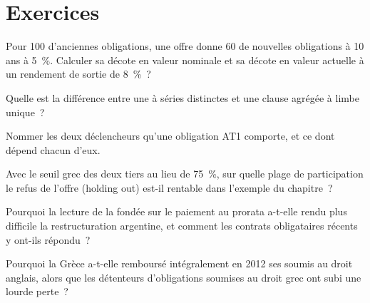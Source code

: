 \section{Exercices}

\begin{exercise}[$\star$]\label{exo:m2:distressed-sovereign-and-bank-capital-credit:1}
Pour 100 d'anciennes obligations, une offre donne 60 de nouvelles obligations à 10 ans à 5~\%. Calculer sa
décote en valeur nominale et sa décote en valeur actuelle à un rendement de sortie de 8~\%~?
\end{exercise}

\begin{exercise}[$\star$]\label{exo:m2:distressed-sovereign-and-bank-capital-credit:2}
Quelle est la différence entre une  à séries distinctes et une
clause agrégée à limbe unique~?
\end{exercise}

\begin{exercise}[$\star$]\label{exo:m2:distressed-sovereign-and-bank-capital-credit:3}
Nommer les deux déclencheurs qu'une obligation AT1 comporte, et ce dont dépend chacun d'eux.
\end{exercise}

\begin{exercise}[$\star\star$]\label{exo:m2:distressed-sovereign-and-bank-capital-credit:4}
Avec le seuil grec des deux tiers au lieu de 75~\%, sur quelle plage de participation
le refus de l'offre (holding out) est-il rentable dans l'exemple du chapitre~?
\end{exercise}

\begin{exercise}[$\star\star$]\label{exo:m2:distressed-sovereign-and-bank-capital-credit:5}
Pourquoi la lecture de la  fondée sur le paiement au prorata a-t-elle
rendu plus difficile la restructuration argentine, et comment les contrats obligataires récents y ont-ils répondu~?
\end{exercise}

\begin{exercise}[$\star\star$]\label{exo:m2:distressed-sovereign-and-bank-capital-credit:6}
Pourquoi la Grèce a-t-elle remboursé intégralement en 2012 ses  soumis au
droit anglais, alors que les détenteurs d'obligations soumises au droit grec ont subi une lourde perte~?
\end{exercise}

